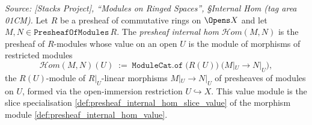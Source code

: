 \begin{definition}

  \label{def:presheaf_internal_hom}
  \textit{Source: [Stacks Project], ``Modules on Ringed Spaces'', \S Internal Hom
  (tag area 01CM).}
  Let \(R\) be a presheaf of commutative rings on \(\Opens X\) and let
  \(M, N \in \mathtt{PresheafOfModules}\,R\). The \emph{presheaf internal hom}
  \(\mathcal{H}om(M, N)\) is the presheaf of \(R\)-modules whose value on an open
  \(U\) is the module of morphisms of restricted modules
  \[
    \mathcal{H}om(M, N)(U)
      \;:=\;
    \mathtt{ModuleCat.of}\;\bigl(R(U)\bigr)\;\bigl(M|_U \longrightarrow N|_U\bigr),
  \]
  the \(R(U)\)-module of \(R|_U\)-linear morphisms \(M|_U \to N|_U\) of presheaves of
  modules on \(U\), formed via the open-immersion restriction \(U \hookrightarrow X\).
  This value module is the slice specialisation
  \cref{def:presheaf_internal_hom_slice_value} of the morphism module
  \cref{def:presheaf_internal_hom_value}.


\end{definition}
